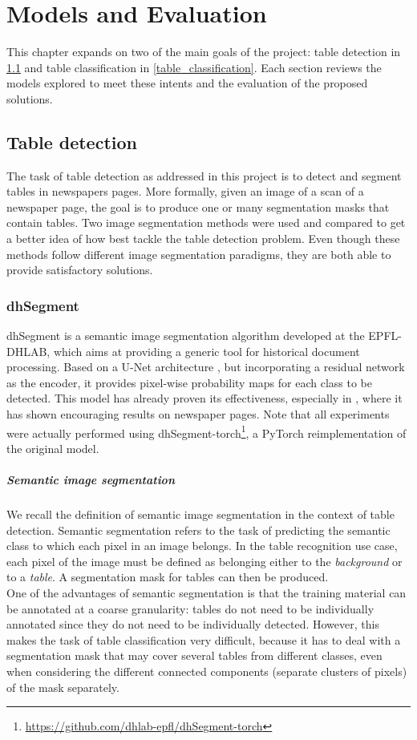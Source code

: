 \chapter{Models and Evaluation}
\label{models}
This chapter expands on two of the main goals of the project: table detection in \ref{table_detection} and table classification in \ref{table_classification}. Each section reviews the models explored to meet these intents and the evaluation of the proposed solutions.

\section{Table detection}
\label{table_detection}
The task of table detection as addressed in this project is to detect and segment tables in newspapers pages. More formally, given an image of a scan of a newspaper page, the goal is to produce one or many segmentation masks that contain tables. Two image segmentation methods were used and compared to get a better idea of how best tackle the table detection problem. Even though these methods follow different image segmentation paradigms, they are both able to provide satisfactory solutions.

\subsection{dhSegment}
dhSegment \citep{ares_oliveira_dhsegment_2018} is a semantic image segmentation algorithm developed at the EPFL-DHLAB, which aims at providing a generic tool for historical document processing. Based on a U-Net architecture \citep{ronneberger_u-net_2015}, but incorporating a residual network as the encoder, it provides pixel-wise probability maps for each class to be detected. This model has already proven its effectiveness, especially in \citet{barman_combining_2021}, where it has shown encouraging results on newspaper pages. Note that all experiments were actually performed using dhSegment-torch\footnote{\url{https://github.com/dhlab-epfl/dhSegment-torch}}, a PyTorch reimplementation of the original model.

\paragraph{Semantic image segmentation}
We recall the definition of semantic image segmentation in the context of table detection. Semantic segmentation refers to the task of predicting the semantic class to which each pixel in an image belongs. In the table recognition use case, each pixel of the image must be defined as belonging either to the \textit{background} or to a \textit{table}. A segmentation mask for tables can then be produced. \\
One of the advantages of semantic segmentation is that the training material can be annotated at a coarse granularity: tables do not need to be individually annotated since they do not need to be individually detected. However, this makes the task of table classification very difficult, because it has to deal with a segmentation mask that may cover several tables from different classes, even when considering the different connected components (separate clusters of pixels) of the mask separately.

